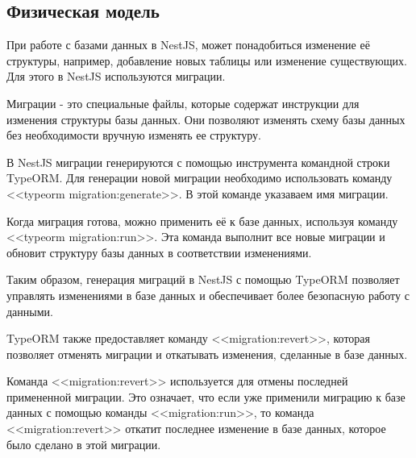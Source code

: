 \subsection{Физическая модель}

При работе с базами данных в NestJS, может понадобиться изменение её структуры, например, добавление новых таблицы или изменение существующих.
Для этого в NestJS используются миграции.

Миграции - это специальные файлы, которые содержат инструкции для изменения структуры базы данных.
Они позволяют изменять схему базы данных без необходимости вручную изменять ее структуру.

В NestJS миграции генерируются с помощью инструмента командной строки TypeORM.
Для генерации новой миграции необходимо использовать команду <<typeorm migration:generate>>.
В этой команде указаваем имя миграции.

Когда миграция готова, можно применить её к базе данных, используя команду <<typeorm migration:run>>.
Эта команда выполнит все новые миграции и обновит структуру базы данных в соответствии изменениями.

Таким образом, генерация миграций в NestJS с помощью TypeORM позволяет управлять изменениями в базе данных и обеспечивает более безопасную работу с данными.

TypeORM также предоставляет команду <<migration:revert>>, которая позволяет отменять миграции и откатывать изменения, сделанные в базе данных.

Команда <<migration:revert>> используется для отмены последней примененной миграции.
Это означает, что если уже применили миграцию к базе данных с помощью команды <<migration:run>>,
то команда <<migration:revert>> откатит последнее изменение в базе данных, которое было сделано в этой миграции.
